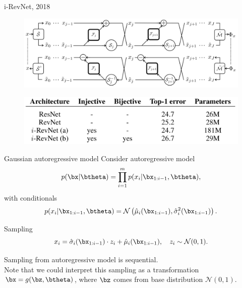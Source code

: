 \begin{frame}{i-RevNet, 2018}
	
	\begin{figure}
		\centering
		\includegraphics[width=\linewidth]{figs/i-revnet.png}
	\end{figure}
	
	\begin{figure}
		\centering
		\includegraphics[width=0.9\linewidth]{figs/i-revnet_block.png}
	\end{figure}

\end{frame}
\begin{frame}{Gaussian autoregressive model}
	Consider autoregressive model
	\[
		p(\bx | \btheta) = \prod_{i=1}^m p(x_i | \bx_{1:i - 1}, \btheta),
	\]
	with conditionals
	\[
	p(x_i | \bx_{1:i - 1}, \btheta) = \mathcal{N} \left(\hat{\mu}_i(\bx_{1:i-1}), \hat{\sigma}^2_i (\bx_{1:i-1})\right).
	\]
	\vspace{-0.5cm}
	\begin{block}{Sampling}
		\[
		x_i = \hat{\sigma}_i (\bx_{1:i-1}) \cdot z_i + \hat{\mu}_i(\bx_{1:i-1}), \quad z_i \sim \mathcal{N}(0, 1).
		\]
	\end{block}
	Sampling from autoregressive model is sequential. \\
	Note that we could interpret this sampling as a transformation $\bx = g(\bz, \btheta)$, where $\bz$ comes from base distribution $\mathcal{N}(0, 1)$.
\end{frame}
